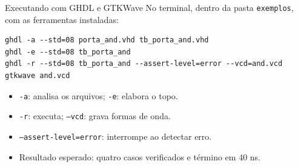 \begin{frame}[fragile,t]{Executando com GHDL e GTKWave}
\small No terminal, dentro da pasta \texttt{exemplos}, com as ferramentas instaladas:\begin{lstlisting}
ghdl -a --std=08 porta_and.vhd tb_porta_and.vhd
ghdl -e --std=08 tb_porta_and
ghdl -r --std=08 tb_porta_and --assert-level=error --vcd=and.vcd
gtkwave and.vcd
\end{lstlisting}\begin{itemize}
\item \texttt{-a}: analisa os arquivos; \texttt{-e}: elabora o topo.
\item \texttt{-r}: executa; \texttt{--vcd}: grava formas de onda.
\item \texttt{--assert-level=error}: interrompe ao detectar erro.
\item Resultado esperado: quatro casos verificados e término em 40 ns.
\end{itemize}
\end{frame}
